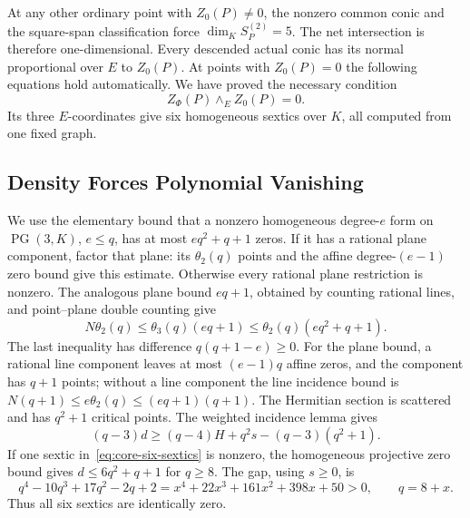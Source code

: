 \documentclass[12pt,letterpaper,onecolumn]{article}
\theoremstyle{definition}
\theoremstyle{remark}
\DeclareMathOperator{\PG}{PG}
\begin{document}
At any other ordinary point with \(Z_0(P)\ne0\), the nonzero common conic and the square-span classification force \(\dim_KS_P^{(2)}=5\).
The net intersection is therefore one-dimensional. Every descended actual conic has its normal proportional over \(E\) to \(Z_0(P)\).
At points with \(Z_0(P)=0\) the following equations hold automatically. We have proved the necessary condition
\begin{equation}\label{eq:core-six-sextics}
Z_\Phi(P)\wedge_E Z_0(P)=0.
\end{equation}
Its three \(E\)-coordinates give six homogeneous sextics over \(K\), all computed from one fixed graph.

\subsection{Density Forces Polynomial Vanishing}
We use the elementary bound that a nonzero homogeneous degree-\(e\) form on \(\PG(3,K)\), \(e\le q\), has at most \(eq^2+q+1\) zeros.
If it has a rational plane component, factor that plane: its \(\theta_2(q)\) points and the affine degree-\((e-1)\) zero bound give this estimate.
Otherwise every rational plane restriction is nonzero. The analogous plane bound \(eq+1\), obtained by counting rational lines, and point--plane double counting give
\[
N\theta_2(q)\le\theta_3(q)(eq+1)
\le\theta_2(q)(eq^2+q+1).
\]
The last inequality has difference \(q(q+1-e)\ge0\).
For the plane bound, a rational line component leaves at most \((e-1)q\) affine zeros, and the component has \(q+1\) points; without a line component the line incidence bound is \(N(q+1)\le e\theta_2(q)\le(eq+1)(q+1)\).
The Hermitian section is scattered and has \(q^2+1\) critical points.
The weighted incidence lemma gives
\[
(q-3)d\ge(q-4)H+q^2s-(q-3)(q^2+1).
\]
If one sextic in~\eqref{eq:core-six-sextics} is nonzero, the homogeneous projective zero bound gives
\(d\le6q^2+q+1\) for \(q\ge8\).
The gap, using \(s\ge0\), is
\[
q^4-10q^3+17q^2-2q+2
=x^4+22x^3+161x^2+398x+50>0,
\qquad q=8+x.
\]
Thus all six sextics are identically zero.
\end{document}
